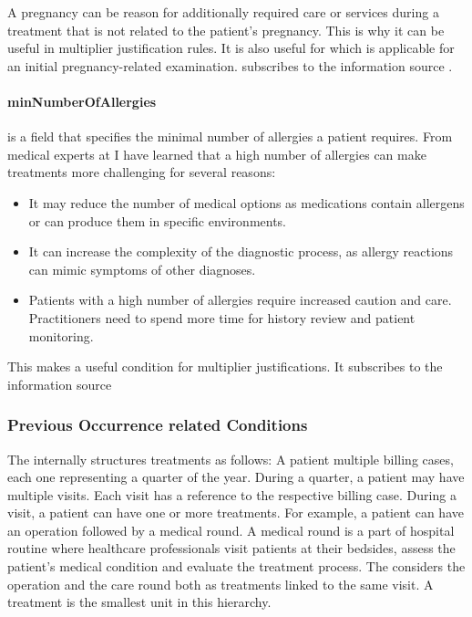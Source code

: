 

A pregnancy can be reason for additionally required care or services during a treatment that is not related to the patient's pregnancy.
This is why it can be useful in multiplier justification rules.
It is also useful for  which is applicable for an initial pregnancy-related examination.
 subscribes to the information source .

\paragraph{minNumberOfAllergies}
 is a field that specifies the minimal number of allergies a patient requires.
From medical experts at \AV I have learned that a high number of allergies can make treatments more challenging for several reasons:
\begin{itemize}
    \item It may reduce the number of medical options as medications contain allergens or can produce them in specific environments.
    \item It can increase the complexity of the diagnostic process, as allergy reactions can mimic symptoms of other diagnoses.
    \item Patients with a high number of allergies require increased caution and care.
    Practitioners need to spend more time for history review and patient monitoring.
\end{itemize}
This makes  a useful condition for multiplier justifications.
It subscribes to the information source 

\subsubsection{Previous Occurrence related Conditions}

The \AVS internally structures treatments as follows:
A patient multiple billing cases, each one representing a quarter of the year.
During a quarter, a patient may have multiple visits.
Each visit has a reference to the respective billing case.
During a visit, a patient can have one or more treatments.
For example, a patient can have an operation followed by a medical round.
A medical round is a part of hospital routine where healthcare professionals visit patients at their bedsides,
assess the patient's medical condition and evaluate the treatment process.
The \AVS considers the operation and the care round both as treatments linked to the same visit.
A treatment is the smallest unit in this hierarchy.


